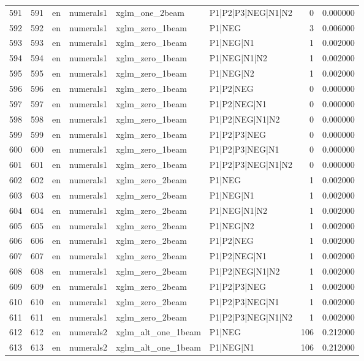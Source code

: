\begin{tabular}{lrllllrr}
591 & 591 & en & numerals1 & xglm_one_2beam & P1|P2|P3|NEG|N1|N2 & 0 & 0.000000 \\
592 & 592 & en & numerals1 & xglm_zero_1beam & P1|NEG & 3 & 0.006000 \\
593 & 593 & en & numerals1 & xglm_zero_1beam & P1|NEG|N1 & 1 & 0.002000 \\
594 & 594 & en & numerals1 & xglm_zero_1beam & P1|NEG|N1|N2 & 1 & 0.002000 \\
595 & 595 & en & numerals1 & xglm_zero_1beam & P1|NEG|N2 & 1 & 0.002000 \\
596 & 596 & en & numerals1 & xglm_zero_1beam & P1|P2|NEG & 0 & 0.000000 \\
597 & 597 & en & numerals1 & xglm_zero_1beam & P1|P2|NEG|N1 & 0 & 0.000000 \\
598 & 598 & en & numerals1 & xglm_zero_1beam & P1|P2|NEG|N1|N2 & 0 & 0.000000 \\
599 & 599 & en & numerals1 & xglm_zero_1beam & P1|P2|P3|NEG & 0 & 0.000000 \\
600 & 600 & en & numerals1 & xglm_zero_1beam & P1|P2|P3|NEG|N1 & 0 & 0.000000 \\
601 & 601 & en & numerals1 & xglm_zero_1beam & P1|P2|P3|NEG|N1|N2 & 0 & 0.000000 \\
602 & 602 & en & numerals1 & xglm_zero_2beam & P1|NEG & 1 & 0.002000 \\
603 & 603 & en & numerals1 & xglm_zero_2beam & P1|NEG|N1 & 1 & 0.002000 \\
604 & 604 & en & numerals1 & xglm_zero_2beam & P1|NEG|N1|N2 & 1 & 0.002000 \\
605 & 605 & en & numerals1 & xglm_zero_2beam & P1|NEG|N2 & 1 & 0.002000 \\
606 & 606 & en & numerals1 & xglm_zero_2beam & P1|P2|NEG & 1 & 0.002000 \\
607 & 607 & en & numerals1 & xglm_zero_2beam & P1|P2|NEG|N1 & 1 & 0.002000 \\
608 & 608 & en & numerals1 & xglm_zero_2beam & P1|P2|NEG|N1|N2 & 1 & 0.002000 \\
609 & 609 & en & numerals1 & xglm_zero_2beam & P1|P2|P3|NEG & 1 & 0.002000 \\
610 & 610 & en & numerals1 & xglm_zero_2beam & P1|P2|P3|NEG|N1 & 1 & 0.002000 \\
611 & 611 & en & numerals1 & xglm_zero_2beam & P1|P2|P3|NEG|N1|N2 & 1 & 0.002000 \\
612 & 612 & en & numerals2 & xglm_alt_one_1beam & P1|NEG & 106 & 0.212000 \\
613 & 613 & en & numerals2 & xglm_alt_one_1beam & P1|NEG|N1 & 106 & 0.212000 \\

\end{tabular}
